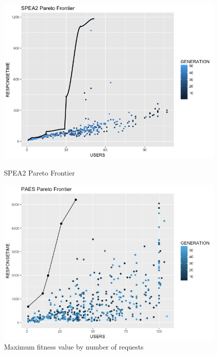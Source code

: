 \documentclass{report}
\begin{document}
\begin{figure}[h]
\begin{minipage}{.5\textwidth}
\centering
\includegraphics[width=1\textwidth]{./images/spea2paretofrontier2.png}
\caption{SPEA2 Pareto Frontier}
\label{fig:paretofrontier2}
\end{minipage}
\begin{minipage}{.5\textwidth}
\centering
\includegraphics[width=1\textwidth]{./images/paesfrontier2.jpeg}
\caption{Maximum fitness value by number of requests}
\label{fig:paretofrontier2}
\end{minipage}
\end{figure}




\end{document}
